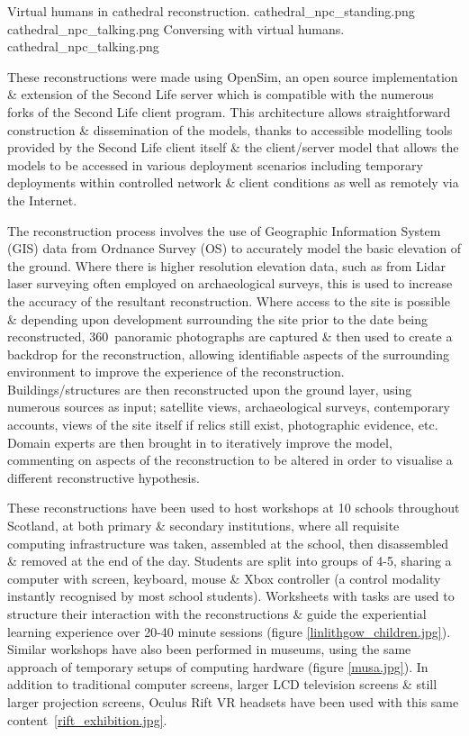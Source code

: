  {Virtual humans in cathedral reconstruction.} {cathedral_npc_standing.png}
       {cathedral_npc_talking.png} {Conversing with virtual humans.} {cathedral_npc_talking.png}

These reconstructions were made using OpenSim, an open source implementation \& extension of the Second Life server which is compatible with the numerous forks of the Second Life client program. This architecture allows straightforward construction \& dissemination of the models, thanks to accessible modelling tools provided by the Second Life client itself \& the client/server model that allows the models to be accessed in various deployment scenarios including temporary deployments within controlled network \& client conditions as well as remotely via the Internet.

The reconstruction process involves the use of Geographic Information System (GIS) data from Ordnance Survey (OS) to accurately model the basic elevation of the ground. Where there is higher resolution elevation data, such as from Lidar laser surveying often employed on archaeological surveys, this is used to increase the accuracy of the resultant reconstruction. Where access to the site is possible \& depending upon development surrounding the site prior to the date being reconstructed, 360\textdegree\ panoramic photographs are captured \& then used to create a backdrop for the reconstruction, allowing identifiable aspects of the surrounding environment to improve the experience of the reconstruction. Buildings/structures are then reconstructed upon the ground layer, using numerous sources as input; satellite views, archaeological surveys, contemporary accounts, views of the site itself if relics still exist, photographic evidence, etc. Domain experts are then brought in to iteratively improve the model, commenting on aspects of the reconstruction to be altered in order to visualise a different reconstructive hypothesis.

These reconstructions have been used to host workshops at 10 schools throughout Scotland, at both primary \& secondary institutions, where all requisite computing infrastructure was taken, assembled at the school, then disassembled \& removed at the end of the day. Students are split into groups of 4-5, sharing a computer with screen, keyboard, mouse \& Xbox controller (a control modality instantly recognised by most school students). Worksheets with tasks are used to structure their interaction with the reconstructions \& guide the experiential learning experience over 20-40 minute sessions (figure \ref{linlithgow_children.jpg}). Similar workshops have also been performed in museums, using the same approach of temporary setups of computing hardware (figure \ref{musa.jpg}). In addition to traditional computer screens, larger LCD television screens \& still larger projection screens, Oculus Rift VR headsets have been used with this same content~\ref{rift_exhibition.jpg}.

